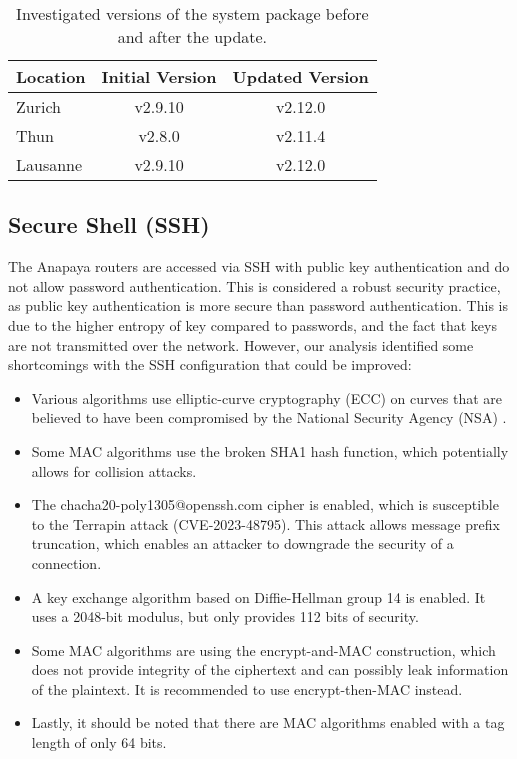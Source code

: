 \begin{table}[h]
    \centering
    \begin{tabular}{|l|c|c|}
        \hline
        \textbf{Location} & \textbf{Initial Version} & \textbf{Updated Version} \\
        \hline
        Zurich & v2.9.10 & v2.12.0 \\
        \hline
        Thun & v2.8.0 & v2.11.4\\
        \hline
        Lausanne & v2.9.10 & v2.12.0\\
        \hline
    \end{tabular}
    \caption{Investigated versions of the system package before and after the update.}
    \label{tab:system_software_versions}
\end{table}



\subsection{Secure Shell (SSH)}
\label{sec:ssh}
The Anapaya routers are accessed via SSH with public key authentication and do not allow password authentication.
This is considered a robust security practice, as public key authentication is more secure than password authentication.
This is due to the higher entropy of key compared to passwords, and the fact that keys are not transmitted over the network.
However, our analysis identified some shortcomings with the SSH configuration that could be improved:
\newpage
\begin{itemize}
    \item Various algorithms use elliptic-curve cryptography (ECC) on curves that are believed to have been compromised by the National Security Agency (NSA) \cite{nist1_safecurves}.
    \item Some MAC algorithms use the broken SHA1 hash function, which potentially allows for collision attacks.
    \item The chacha20-poly1305@openssh.com cipher is enabled, which is susceptible to the Terrapin attack (CVE-2023-48795).
    This attack allows message prefix truncation, which enables an attacker to downgrade the security of a connection.
    \item A key exchange algorithm based on Diffie-Hellman group 14 is enabled. It uses a 2048-bit modulus, but only provides 112 bits of security.
    \item Some MAC algorithms are using the encrypt-and-MAC construction, which does not provide integrity of the ciphertext and can possibly leak information of the plaintext.
    It is recommended to use encrypt-then-MAC instead.
    \item Lastly, it should be noted that there are MAC algorithms enabled with a tag length of only 64 bits.
\end{itemize}

